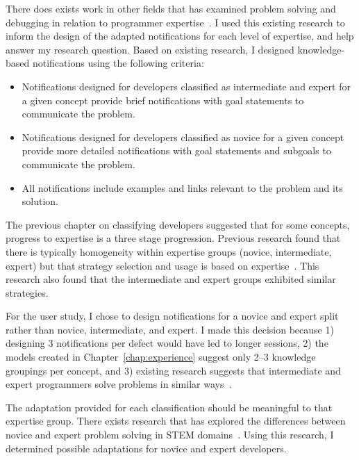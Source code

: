 There does exists work in other fields that has examined problem solving and debugging in relation to programmer expertise~\cite{larkin1980expert, mckeithen1981knowledge, Wiedenbeck:1993:Mental}. I used this existing research to inform the design of the adapted notifications for each level of expertise, and help answer my research question. Based on existing research, I designed knowledge-based notifications using the following criteria:
\begin{itemize}
    \item Notifications designed for developers classified as intermediate and expert for a given concept provide brief notifications with goal statements to communicate the problem.
    \item Notifications designed for developers classified as novice for a given concept provide more detailed notifications with goal statements and subgoals to communicate the problem.
    \item All notifications include examples and links relevant to the problem and its solution.
\end{itemize}

The previous chapter on classifying developers suggested that for some concepts, progress to expertise is a three stage progression. Previous research found that there is typically homogeneity within expertise groups (novice, intermediate, expert) but that strategy selection and usage is based on expertise~\cite{mckeithen1981knowledge}. This research also found that the intermediate and expert groups exhibited similar strategies.  

For the user study, I chose to design notifications for a novice and expert split rather than novice, intermediate, and expert. I made this decision because 1) designing 3 notifications per defect would have led to longer sessions, 2) the models created in Chapter~\ref{chap:experience} suggest only 2--3 knowledge groupings per concept, and 3) existing research suggests that intermediate and expert programmers solve problems in similar ways~\cite{mckeithen1981knowledge}.

The adaptation provided for each classification should be meaningful to that expertise group. There exists research that has explored the differences between novice and expert problem solving in STEM domains~\cite{larkin1980expert, Wiedenbeck:1993:Mental}. Using this research, I determined possible adaptations for novice and expert developers.

